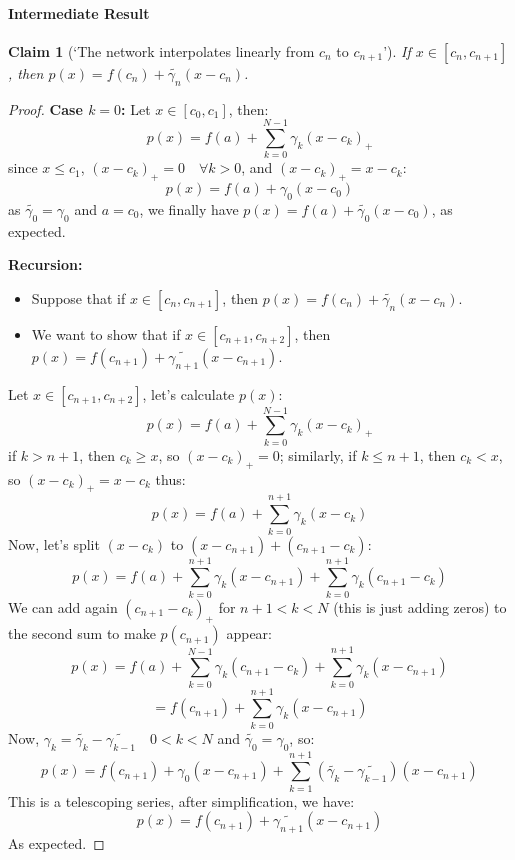 \documentclass[]{article}
\newtheorem*{claim}{Claim}
\begin{document}
\paragraph{Intermediate Result}
\begin{claim}[`The network interpolates linearly from $c_n$ to $c_{n+1}$']
	If $x \in \left[ c_n, c_{n+1} \right]$, then $p(x) = f(c_n) + \tilde{\gamma_n}(x-c_n)$.
\end{claim}
\begin{proof}
	\textbf{Case $k=0$:}\newline
	Let $x \in \left[ c_0, c_1 \right]$, then:
	$$p(x) = f(a) + \sum_{k=0}^{N-1} \gamma_k (x - c_k)_+$$
	since $x \leq c_1$, $(x - c_k)_+ = 0 \quad \forall k>0$, and $(x - c_k)_+ = x - c_k$: 
	$$p(x) = f(a) + \gamma_0 (x - c_0)$$
	as $\tilde{\gamma_0} =\gamma_0$ and $a = c_0$, we finally have $p(x) = f(a) + \tilde{\gamma_0}(x - c_0)$, as expected.
	
	\textbf{Recursion:}\newline
	\begin{itemize}
		\item Suppose that if $x \in \left[ c_n, c_{n+1} \right]$, then $p(x) = f(c_n) + \tilde{\gamma_n}(x-c_n)$.
		\item We want to show that if $x \in \left[ c_{n+1}, c_{n+2} \right]$, then $p(x) = f(c_{n+1}) + \tilde{\gamma_{n+1}}(x-c_{n+1})$.
	\end{itemize}
	Let $x \in \left[ c_{n+1}, c_{n+2} \right]$, let's calculate $p(x)$:
	$$p(x) = f(a) + \sum_{k=0}^{N-1} \gamma_k (x - c_k)_+$$
	if $k > n+1$, then $c_k \geq x$, so $(x - c_k)_+ = 0$; similarly, 
	if $k \leq n+1$, then $c_k < x$, so $(x - c_k)_+ = x - c_k$ thus:
	$$p(x) = f(a) + \sum_{k=0}^{n+1} \gamma_k (x - c_k)$$
	Now, let's split $(x - c_k)$ to $(x - c_{n+1}) + (c_{n+1} - c_k)$:
	$$p(x) = f(a) + \sum_{k=0}^{n+1} \gamma_k (x - c_{n+1}) + \sum_{k=0}^{n+1} \gamma_k (c_{n+1} - c_k)$$
	We can add again $(c_{n+1} - c_k)_+$ for $n+1 < k < N$ (this is just adding zeros) to the second sum to make $p(c_{n+1})$ appear:
	$$p(x) = f(a) + \sum_{k=0}^{N-1} \gamma_k (c_{n+1} - c_k) + \sum_{k=0}^{n+1} \gamma_k (x - c_{n+1})$$
	$$= f(c_{n+1}) + \sum_{k=0}^{n+1} \gamma_k (x - c_{n+1})$$
	Now, $\gamma_k = \tilde{\gamma_k} - \tilde{\gamma_{k-1}} \quad 0 < k <N$ and $\tilde{\gamma_0} = \gamma_0$, so:
	$$p(x) = f(c_{n+1}) + \gamma_0 (x - c_{n+1}) + \sum_{k=1}^{n+1} (\tilde{\gamma_k} - \tilde{\gamma_{k-1}}) (x - c_{n+1})$$
	This is a telescoping series, after simplification, we have:
	$$p(x) = f(c_{n+1}) + \tilde{\gamma_{n+1}} (x - c_{n+1})$$
	As expected.
\end{proof}
\end{document}

